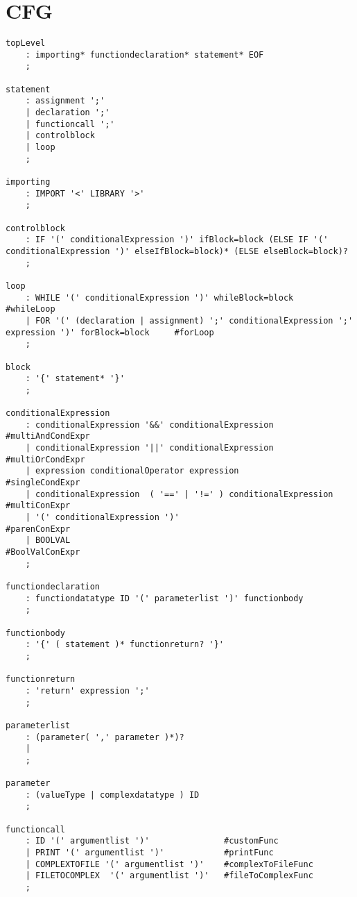 \chapter{CFG}\label{app:CFG}
\begin{lstlisting}[caption={\acrshort{cfg} and Lexing rules},frame=tlrb,numbers=none]
topLevel
    : importing* functiondeclaration* statement* EOF
    ;

statement
    : assignment ';'
    | declaration ';'
    | functioncall ';'
    | controlblock
    | loop
    ;

importing
    : IMPORT '<' LIBRARY '>'
    ; 

controlblock
    : IF '(' conditionalExpression ')' ifBlock=block (ELSE IF '(' conditionalExpression ')' elseIfBlock=block)* (ELSE elseBlock=block)?
    ;

loop
    : WHILE '(' conditionalExpression ')' whileBlock=block      #whileLoop
    | FOR '(' (declaration | assignment) ';' conditionalExpression ';' expression ')' forBlock=block     #forLoop  
    ;

block
    : '{' statement* '}'
    ;
    
conditionalExpression
    : conditionalExpression '&&' conditionalExpression                  #multiAndCondExpr
    | conditionalExpression '||' conditionalExpression                  #multiOrCondExpr
    | expression conditionalOperator expression                         #singleCondExpr
    | conditionalExpression  ( '==' | '!=' ) conditionalExpression      #multiConExpr
    | '(' conditionalExpression ')'                                     #parenConExpr
    | BOOLVAL                                                           #BoolValConExpr
    ;

functiondeclaration
    : functiondatatype ID '(' parameterlist ')' functionbody
    ; 
    
functionbody
    : '{' ( statement )* functionreturn? '}'
    ;

functionreturn
    : 'return' expression ';'
    ;

parameterlist
    : (parameter( ',' parameter )*)?
    | 
    ;

parameter
    : (valueType | complexdatatype ) ID
    ;

functioncall
    : ID '(' argumentlist ')'               #customFunc
    | PRINT '(' argumentlist ')'            #printFunc
    | COMPLEXTOFILE '(' argumentlist ')'    #complexToFileFunc
    | FILETOCOMPLEX  '(' argumentlist ')'   #fileToComplexFunc
    ;


\end{lstlisting}
